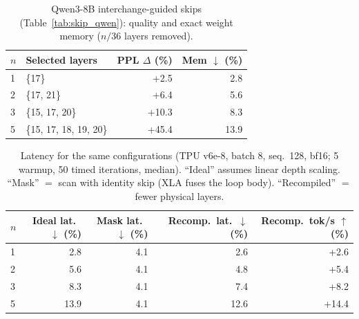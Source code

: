 \begin{table}[htbp]
\centering
\caption{Pythia-1.4B full baseline suite on a standardized 10K-word WikiText-2 evaluator (baseline PPL\,$=$\,12.12). Lower is better. Random reports the mean over 5 trials.}
\label{tab:pythia_baselines}
\end{table}

\begin{table}[htbp]
\centering
\caption{Qwen3-8B interchange-guided skips (Table~\ref{tab:skip_qwen}): quality and exact weight memory ($n/36$ layers removed).}
\label{tab:qwen_deployment}
\setlength{\tabcolsep}{8pt}
\begin{tabular}{@{}l l r r@{}}
\toprule
$n$ & Selected layers & PPL $\Delta$ (\%) & Mem $\downarrow$ (\%) \\
\midrule
1 & \{17\} & +2.5 & 2.8 \\
2 & \{17, 21\} & +6.4 & 5.6 \\
3 & \{15, 17, 20\} & +10.3 & 8.3 \\
5 & \{15, 17, 18, 19, 20\} & +45.4 & 13.9 \\
\bottomrule
\end{tabular}
\end{table}

\begin{table}[htbp]
\centering
\caption{Latency for the same configurations (TPU v6e-8, batch 8, seq.\ 128, bf16; 5 warmup, 50 timed iterations, median). ``Ideal'' assumes linear depth scaling. ``Mask'' $=$ scan with identity skip (XLA fuses the loop body). ``Recompiled'' $=$ fewer physical layers.}
\label{tab:qwen_deployment_latency}
\setlength{\tabcolsep}{6pt}
\begin{tabular}{@{}l rrrr@{}}
\toprule
$n$ & Ideal lat.\ $\downarrow$ (\%) & Mask lat.\ $\downarrow$ (\%) & Recomp.\ lat.\ $\downarrow$ (\%) & Recomp.\ tok/s $\uparrow$ (\%) \\
\midrule
1 & 2.8 & 4.1 & 2.6 & +2.6 \\
2 & 5.6 & 4.1 & 4.8 & +5.4 \\
3 & 8.3 & 4.1 & 7.4 & +8.2 \\
5 & 13.9 & 4.1 & 12.6 & +14.4 \\
\bottomrule
\end{tabular}
\end{table}

